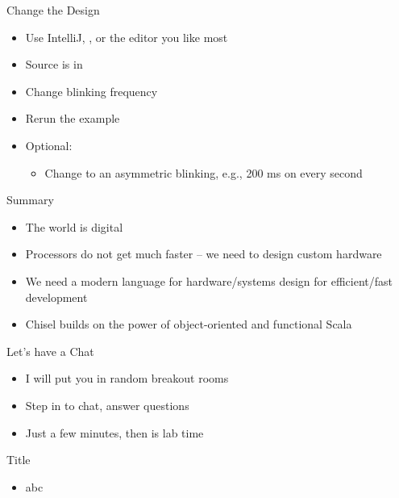 \begin{frame}[fragile]{Change the Design}
\begin{itemize}
\item Use IntelliJ, , or the editor you like most
\item Source is in 
\item Change blinking frequency
\item Rerun the example
\item Optional:
\begin{itemize}
\item Change to an asymmetric blinking, e.g., 200 ms on every second 
\end{itemize}
\end{itemize}
\end{frame}

\begin{frame}[fragile]{Summary}
\begin{itemize}
\item The world is digital
\item Processors do not get much faster -- we need to design custom hardware
\item We need a modern language for hardware/systems design for efficient/fast development
\item Chisel builds on the power of object-oriented and functional Scala
\end{itemize}
\end{frame}

\begin{frame}[fragile]{Let's have a Chat}
\begin{itemize}
\item I will put you in random breakout rooms
\item Step in to chat, answer questions
\item Just a few minutes, then is lab time
\end{itemize}
\end{frame}



\begin{frame}[fragile]{Title}
\begin{itemize}
\item abc
\end{itemize}
\end{frame}
